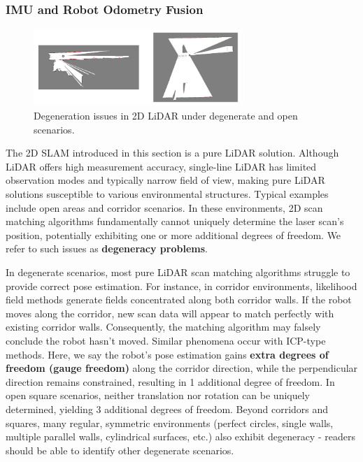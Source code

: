 \subsubsection{IMU and Robot Odometry Fusion}

\begin{figure}[!htp]
	\centering
	\includegraphics[width=0.7\textwidth]{resources/2d-lidar-mapping/bad-cases.pdf}
	\caption{Degeneration issues in 2D LiDAR under degenerate and open scenarios.}
	\label{fig:bad-cases}
\end{figure}

The 2D SLAM introduced in this section is a pure LiDAR solution. Although LiDAR offers high measurement accuracy, single-line LiDAR has limited observation modes and typically narrow field of view, making pure LiDAR solutions susceptible to various environmental structures. Typical examples include open areas and corridor scenarios. In these environments, 2D scan matching algorithms fundamentally cannot uniquely determine the laser scan's position, potentially exhibiting one or more additional degrees of freedom. We refer to such issues as \textbf{degeneracy problems}.

In degenerate scenarios, most pure LiDAR scan matching algorithms struggle to provide correct pose estimation. For instance, in corridor environments, likelihood field methods generate fields concentrated along both corridor walls. If the robot moves along the corridor, new scan data will appear to match perfectly with existing corridor walls. Consequently, the matching algorithm may falsely conclude the robot hasn't moved. Similar phenomena occur with ICP-type methods. Here, we say the robot's pose estimation gains \textbf{extra degrees of freedom (gauge freedom)} along the corridor direction, while the perpendicular direction remains constrained, resulting in 1 additional degree of freedom. In open square scenarios, neither translation nor rotation can be uniquely determined, yielding 3 additional degrees of freedom. Beyond corridors and squares, many regular, symmetric environments (perfect circles, single walls, multiple parallel walls, cylindrical surfaces, etc.) also exhibit degeneracy - readers should be able to identify other degenerate scenarios.

